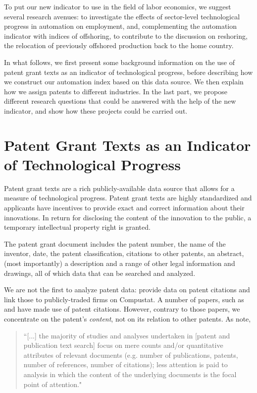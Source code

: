 \documentclass[11pt,a4paper,fleqn]{article}
\begin{document}
To put our new indicator to use in the field of labor economics, we suggest several research avenues: to investigate the effects of sector-level technological progress in automation on employment, and, complementing the automation indicator with indices of offshoring, to contribute to the discussion on reshoring, the relocation of previously offshored production back to the home country.

In what follows, we first present some background information on the use of patent grant texts as an indicator of technological progress, before describing how we construct our automation index based on this data source. We then explain how we assign patents to different industries. In the last part, we propose different research questions that could be answered with the help of the new indicator, and show how these projects could be carried out.


\section{Patent Grant Texts as an Indicator of Technological Progress}
Patent grant texts are a rich publicly-available data source that allows for a measure of technological progress. Patent grant texts are highly standardized and applicants have incentives to provide exact and correct information about their innovations. In return for disclosing the content of the innovation to the public, a temporary intellectual property right is granted. 

The patent grant document includes the patent number, the name of the inventor, date, the patent classification, citations to other patents, an abstract, (most importantly) a description and a range of other legal information and drawings, all of which data that can be searched and analyzed. 

We are not the first to analyze patent data: \cite{HJT2001} provide data on patent citations and link those to publicly-traded firms on Compustat. A number of papers, such as \cite{AAC2014} and \cite{ABP2015} have made use of patent citations. However, contrary to those papers, we concentrate on the patent's \textit{content}, not on its relation to other patents. As \citep[p.~290]{MVS2010} note, 
\begin{quotation} 
``[...] the majority of studies and analyses undertaken in [patent and publication text search] focus on mere counts and/or quantitative attributes of relevant documents (e.g. number of publications, patents, number of references, number of citations); less attention is paid to analysis in which the content of the underlying documents is the focal point of attention."
\end{quotation}
\end{document}
